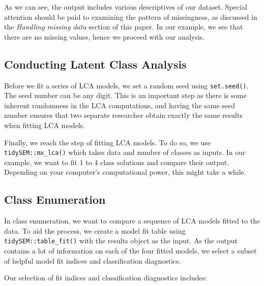 \documentclass[
  ,man,floatsintext]{apa6}
\begin{document}
As we can see, the output includes various descriptives of our dataset.
Special attention should be paid to examining the pattern of missingness,
as discussed in the \emph{Handling missing data} section of this paper.
In our example, we see that there are no missing values,
hence we proceed with our analysis.

\hypertarget{conducting-latent-class-analysis}{%
\subsection{Conducting Latent Class Analysis}\label{conducting-latent-class-analysis}}

Before we fit a series of LCA models, we set a random seed
using \texttt{set.seed()}.
The seed number can be any digit.
This is an important step as
there is some inherent randomness in the LCA computations,
and having the same seed number ensures that
two separate researcher obtain exactly the same results
when fitting LCA models.

Finally, we reach the step of fitting LCA models.
To do so, we use \texttt{tidySEM::mx\_lca()}
which takes data and number of classes as inputs.
In our example, we want to fit 1 to 4 class solutions
and compare their output.
Depending on your computer's computational power,
this might take a while.

\hypertarget{class-enumeration-1}{%
\subsection{Class Enumeration}\label{class-enumeration-1}}

In class enumeration,
we want to compare a sequence of LCA models fitted to the data.
To aid the process, we create a model fit table using \texttt{tidySEM::table\_fit()}
with the results object as the input.
As the output contains a lot of information on each of the four fitted models,
we select a subset of helpful model fit indices and classification diagnostics.

Our selection of fit indices and classification diagnostics includes:
\end{document}
